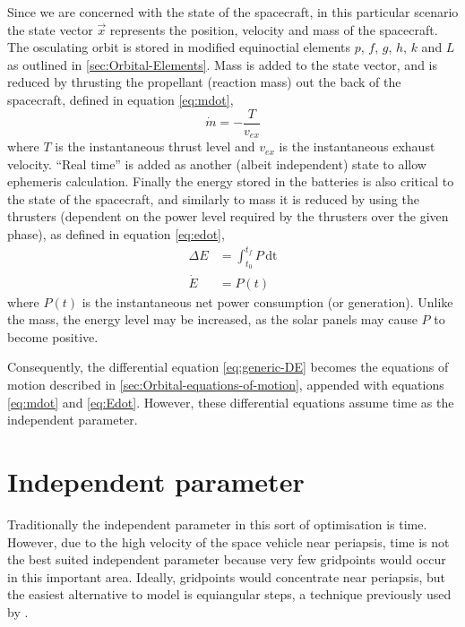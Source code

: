 Since we are concerned with the state of the spacecraft, in this particular scenario the state vector $\vec{x}$ represents the position, velocity and mass of the spacecraft. The osculating orbit is stored in modified equinoctial elements $p$, $f$, $g$, $h$, $k$ and $L$ as outlined in \autoref{sec:Orbital-Elements}. Mass is added to the state vector, and is reduced by thrusting the propellant (reaction mass) out the back of the spacecraft, defined in equation \eqref{eq:mdot},
\begin{equation}
\dot{m}=-\frac{T}{v_{ex}} \label{eq:mdot}
\end{equation}
where $T$ is the instantaneous thrust level and $v_{ex}$ is the instantaneous exhaust velocity. \enquote{Real time} is added as another (albeit independent) state to allow ephemeris calculation. Finally the energy stored in the batteries is also critical to the state of the spacecraft, and similarly to mass it is reduced by using the thrusters (dependent on the power level required by the thrusters over the given phase), as defined in equation \eqref{eq:edot}, 
\begin{subequations}\label{eq:edot}
\begin{align}
\Delta E &= \int_{t_0}^{t_f} P\,\text{dt} \label{eq:delta-E}\\
\dot{E} &= P(t) \label{eq:Edot}
\end{align} 
\end{subequations} where $P(t)$ is the instantaneous net power consumption (or generation). Unlike the mass, the energy level may be increased, as the solar panels may cause $P$ to become positive.

Consequently, the differential equation \eqref{eq:generic-DE} becomes the equations of motion described in \autoref{sec:Orbital-equations-of-motion}, appended with equations \eqref{eq:mdot} and \eqref{eq:Edot}. However, these differential equations assume time as the independent parameter.

\section{Independent parameter} \label{sec:Independent-parameter}

Traditionally the independent parameter in this sort of optimisation is time. However, due to the high velocity of the space vehicle near periapsis, time is not the best suited independent parameter because very few gridpoints would occur in this important area. Ideally, gridpoints would concentrate near periapsis, but the easiest alternative to model is equiangular steps, a technique previously used by \textcite{Betts2003}. 

